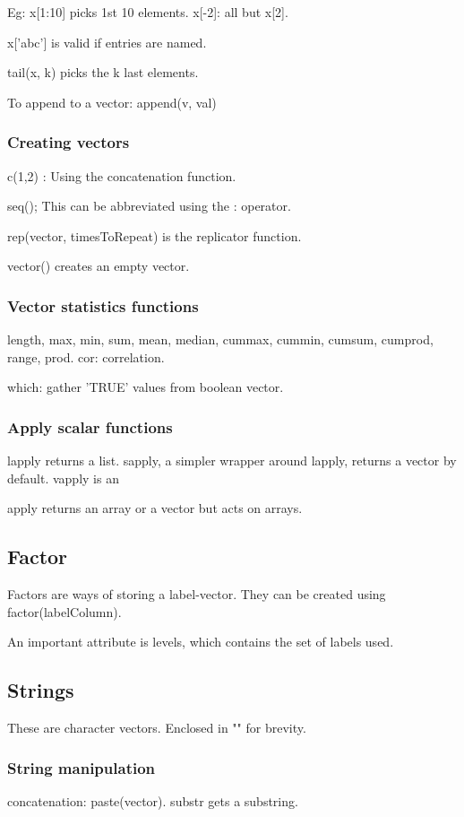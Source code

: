 \documentclass[oneside, article]{memoir}
\begin{document}
Eg: x[1:10] picks 1st 10 elements. x[-2]: all but x[2].

x['abc'] is valid if entries are named.

tail(x, k) picks the k last elements.

To append to a vector: append(v, val)

\subsubsection{Creating vectors}
c(1,2) : Using the concatenation function.

seq(); This can be abbreviated using the : operator.

rep(vector, timesToRepeat) is the replicator function.

vector() creates an empty vector.

\subsubsection{Vector statistics functions}
length, max, min, sum, mean, median, cummax, cummin, cumsum, cumprod, range, prod. cor: correlation.

which: gather 'TRUE' values from boolean vector.

\subsubsection{Apply scalar functions}
lapply returns a list. sapply, a simpler wrapper around lapply, returns a vector by default. vapply is an 

apply returns an array or a vector but acts on arrays.

\subsection{Factor}
Factors are ways of storing a label-vector. They can be created using factor(labelColumn).

An important attribute is levels, which contains the set of labels used.

\subsection{Strings}
These are character vectors. Enclosed in "" for brevity.

\subsubsection{String manipulation}
concatenation: paste(vector). substr gets a substring.
\end{document}
